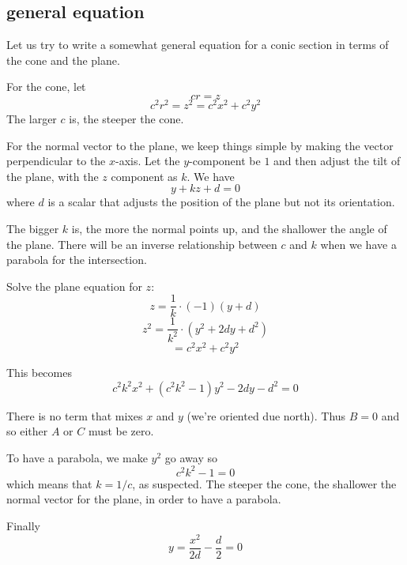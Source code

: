 \documentclass[11pt, oneside]{article}
\begin{document}
\subsection*{general equation}

Let us try to write a somewhat general equation for a conic section in terms of the cone and the plane.

For the cone, let 
\[ cr = z \]
\[ c^2 r^2 = z^2 = c^2 x^2 + c^2 y^2 \]
The larger $c$ is, the steeper the cone.

For the normal vector to the plane, we keep things simple by making the vector perpendicular to the $x$-axis.  Let the $y$-component be $1$ and then adjust the tilt of the plane, with the $z$ component as $k$.  We have
\[  y + kz + d = 0 \]
where $d$ is a scalar that adjusts the position of the plane but not its orientation.

The bigger $k$ is, the more the normal points up, and the shallower the angle of the plane.  There will be an inverse relationship between $c$ and $k$ when we have a parabola for the intersection.

Solve the plane equation for $z$:
\[ z = \frac{1}{k} \cdot (- 1)(y + d) \]
\[ z^2 = \frac{1}{k^2} \cdot (y^2 + 2dy + d^2) \]
\[ = c^2 x^2 + c^2 y^2 \]

This becomes
\[ c^2k^2 x^2 + (c^2k^2-1) y^2 - 2dy - d^2 = 0 \]

There is no term that mixes $x$ and $y$ (we're oriented due north).  Thus $B = 0$ and so either $A$ or $C$ must be zero.

To have a parabola, we make $y^2$ go away so
\[ c^2k^2 - 1 = 0 \]
which means that $k = 1/c$, as suspected.  The steeper the cone, the shallower the normal vector for the plane, in order to have a parabola.

Finally
\[ y = \frac{x^2}{2d} - \frac{d}{2} = 0 \]
\end{document}
